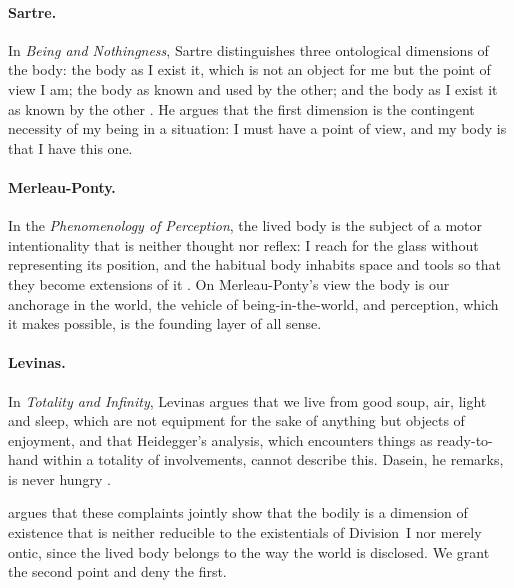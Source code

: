 \documentclass{situationist-preprint}
\begin{document}
\paragraph{Sartre.} In \emph{Being and Nothingness}, Sartre distinguishes three ontological dimensions of the body: the body as I exist it, which is not an object for me but the point of view I am; the body as known and used by the other; and the body as I exist it as known by the other \citep[Part~III, ch.~2]{Sartre1943}. He argues that the first dimension is the contingent necessity of my being in a situation: I must have a point of view, and my body is that I have this one.

\paragraph{Merleau-Ponty.} In the \emph{Phenomenology of Perception}, the lived body is the subject of a motor intentionality that is neither thought nor reflex: I reach for the glass without representing its position, and the habitual body inhabits space and tools so that they become extensions of it \citep{MerleauPonty1945}. On Merleau-Ponty's view the body is our anchorage in the world, the vehicle of being-in-the-world, and perception, which it makes possible, is the founding layer of all sense.

\paragraph{Levinas.} In \emph{Totality and Infinity}, Levinas argues that we live from good soup, air, light and sleep, which are not equipment for the sake of anything but objects of enjoyment, and that Heidegger's analysis, which encounters things as ready-to-hand within a totality of involvements, cannot describe this. Dasein, he remarks, is never hungry \citep[Section~II]{Levinas1961}.

\citet{Aho2009} argues that these complaints jointly show that the bodily is a dimension of existence that is neither reducible to the existentials of Division~I nor merely ontic, since the lived body belongs to the way the world is disclosed. We grant the second point and deny the first.
\end{document}
